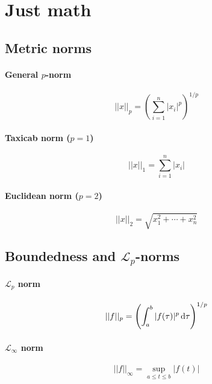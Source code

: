 \section{Just math}

\subsection{Metric norms}
\paragraph{General $p$-norm}
\begin{equation}
	||x||_p
	=
	\left(
		\sum_{i=1}^{n} |x_i|^p
	\right)
	^{1/p}
\end{equation}

\paragraph{Taxicab norm ($p=1$)}
\begin{equation}
	||x||_1
	=
	\sum_{i=1}^{n} |x_i|
\end{equation}

\paragraph{Euclidean norm ($p=2$)}
\begin{equation}
	||x||_2
	=
	\sqrt{x_1^2 + \cdots + x_n^2}
\end{equation}

\subsection[\texorpdfstring{Boundedness and $\mathcal{L}_p$-norms}
	{Boundedness and Lp-norms}]
	{Boundedness and $\mathcal{L}_p$-norms}
\paragraph{$\mathcal{L}_p$ norm}
\begin{equation}
	||f||_p
	=
	\left(
		\int_a^b |f(\tau)|^p \dif \tau
	\right)^{1/p}
\end{equation}

\paragraph{$\mathcal{L}_\infty$ norm}
\begin{equation}
	||f||_\infty
	=
	\sup_{a \leq t \leq b} |f(t)|
\end{equation}

